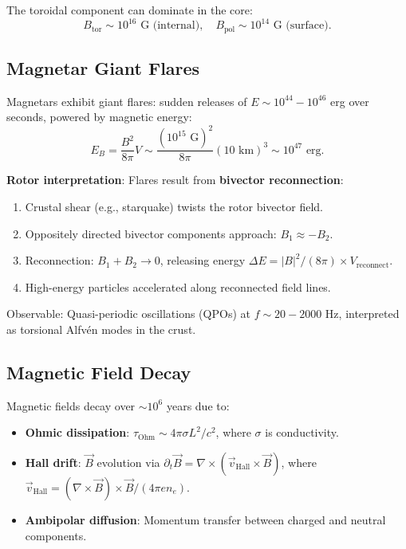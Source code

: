 \documentclass[12pt,a4paper]{article}
\theoremstyle{definition}
\theoremstyle{remark}
\begin{document}
The toroidal component can dominate in the core:
\begin{equation}
B_{\text{tor}} \sim 10^{16} \text{ G (internal)}, \quad B_{\text{pol}} \sim 10^{14} \text{ G (surface)}.
\end{equation}

\subsection{Magnetar Giant Flares}

Magnetars exhibit giant flares: sudden releases of $E \sim 10^{44}-10^{46}$ erg over seconds, powered by magnetic energy:
\begin{equation}
E_B = \frac{B^2}{8\pi} V \sim \frac{(10^{15} \text{ G})^2}{8\pi} (10 \text{ km})^3 \sim 10^{47} \text{ erg}.
\end{equation}

\textbf{Rotor interpretation}: Flares result from \textbf{bivector reconnection}:
\begin{enumerate}
\item Crustal shear (e.g., starquake) twists the rotor bivector field.
\item Oppositely directed bivector components approach: $B_1 \approx -B_2$.
\item Reconnection: $B_1 + B_2 \to 0$, releasing energy $\Delta E = |B|^2/(8\pi) \times V_{\text{reconnect}}$.
\item High-energy particles accelerated along reconnected field lines.
\end{enumerate}

Observable: Quasi-periodic oscillations (QPOs) at $f \sim 20-2000$ Hz, interpreted as torsional Alfvén modes in the crust.

\subsection{Magnetic Field Decay}

Magnetic fields decay over $\sim 10^6$ years due to:
\begin{itemize}
\item \textbf{Ohmic dissipation}: $\tau_{\text{Ohm}} \sim 4\pi \sigma L^2 / c^2$, where $\sigma$ is conductivity.
\item \textbf{Hall drift}: $\vec{B}$ evolution via $\partial_t \vec{B} = \nabla \times (\vec{v}_{\text{Hall}} \times \vec{B})$, where $\vec{v}_{\text{Hall}} = (\nabla \times \vec{B}) \times \vec{B} / (4\pi en_e)$.
\item \textbf{Ambipolar diffusion}: Momentum transfer between charged and neutral components.
\end{itemize}
\end{document}
